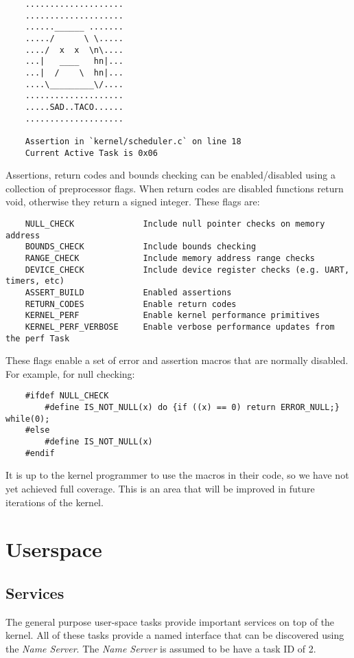 \documentclass[twoside,a4paper]{refart}
\begin{document}
\begin{verbatim}
    ....................
    ....................
    ......______ .......
    ...../      \ \.....
    ..../  x  x  \n\....
    ...|   ____   hn|...
    ...|  /    \  hn|...
    ....\_________\/....
    ....................
    .....SAD..TACO......
    ....................

    Assertion in `kernel/scheduler.c` on line 18
    Current Active Task is 0x06
\end{verbatim}

Assertions, return codes and bounds checking can be enabled/disabled using a collection of preprocessor flags. When return codes are disabled functions return void, otherwise they return a signed integer. These flags are:\\
\begin{verbatim}
    NULL_CHECK              Include null pointer checks on memory address
    BOUNDS_CHECK            Include bounds checking
    RANGE_CHECK             Include memory address range checks
    DEVICE_CHECK            Include device register checks (e.g. UART, timers, etc)
    ASSERT_BUILD            Enabled assertions
    RETURN_CODES            Enable return codes
    KERNEL_PERF             Enable kernel performance primitives
    KERNEL_PERF_VERBOSE     Enable verbose performance updates from the perf Task
\end{verbatim}

These flags enable a set of error and assertion macros that are normally disabled. For example, for null checking:

\begin{verbatim}
    #ifdef NULL_CHECK
        #define IS_NOT_NULL(x) do {if ((x) == 0) return ERROR_NULL;} while(0);
    #else
        #define IS_NOT_NULL(x)
    #endif
\end{verbatim}

It is up to the kernel programmer to use the macros in their code, so we have not yet achieved full coverage. This is an area that will be improved in future iterations of the kernel.
\section{Userspace}
\subsection{Services}
The general purpose user-space tasks provide important services on top of the kernel. All of these tasks provide a named interface that can be discovered using the \textit{Name Server}. The \textit{Name Server} is assumed to be have a task ID of 2.
\end{document}
